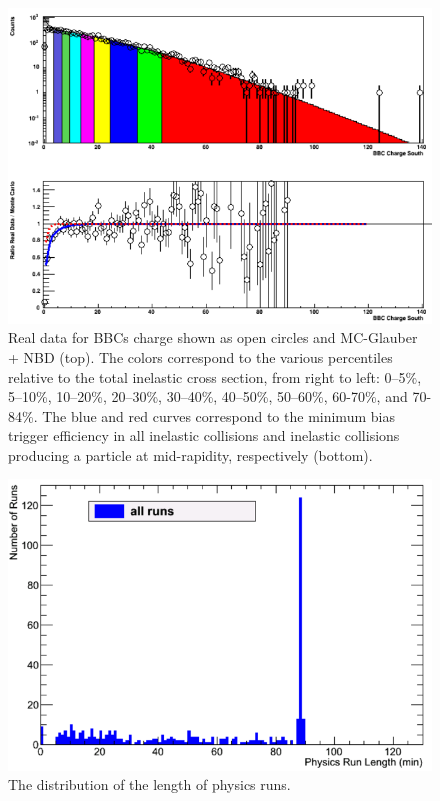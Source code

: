 \begin{figure}[!h]
\centering
\includegraphics[width=0.65\linewidth]{figs/centrality_determination.png}
\caption{Real data for BBCs charge shown as open circles and MC-Glauber + NBD (top). The colors correspond to the various percentiles relative to the total inelastic \pau cross section, from right to left: 0--5$\%$, 5--10\%, 10--20\%, 20--30\%, 30--40\%, 40--50\%, 50--60\%, 60-70\%, and 70-84\%. The blue and red curves correspond to the minimum bias trigger efficiency in all inelastic collisions and inelastic collisions producing a particle at mid-rapidity, respectively (bottom).}
\label{fig:cent_determination_plot}
\end{figure}


\iffalse

\begin{figure}[!h]
\begin{center}
\includegraphics[width=0.65\linewidth]{figs/hruntime.png}
\caption{The distribution of the length of physics runs.}
\end{center}
\end{figure}

